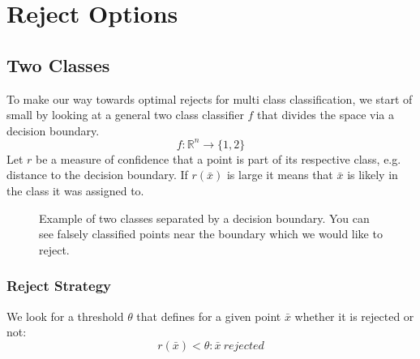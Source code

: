 %
\chapter{Reject Options}
\label{sec:options}

\section{Two Classes}
\label{twoclasses}
To make our way towards optimal rejects for multi class classification, we start of small by looking at a general two class classifier $f$ that divides the space via a decision boundary. 
$$ f: \mathbb{R}^n \to \{1,2\} $$
Let $r$ be a measure of confidence that a point is part of its respective class, e.g. distance to the decision boundary. If $r(\bar{x})$ is large it means that $\bar{x}$ is likely in the class it was assigned to.

\begin{figure}[!htbp]
\centering
\caption{Example of two classes separated by a decision boundary. You can see falsely classified points near the boundary which we would like to reject.}
\label{decBound}
\end{figure}

\subsection{Reject Strategy}
We look for a threshold $\theta$ that defines for a given point $\bar{x}$ whether it is rejected or not:
$$ r(\bar{x}) < \theta : \bar{x} \  rejected $$


